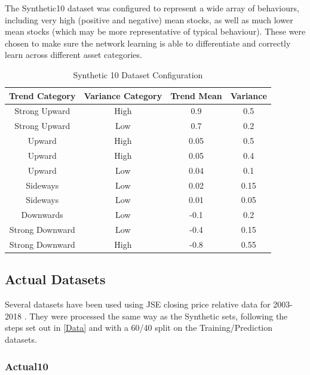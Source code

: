 \documentclass[a4paper,11pt,oneside]{article}
\theoremstyle{plain}
\theoremstyle{definition}
\begin{document}
The Synthetic10 dataset was configured to represent a wide array of behaviours, including very high (positive and negative) mean stocks, as well as much lower mean stocks (which may be more representative of typical behaviour). These were chosen to make sure the network learning is able to differentiate and correctly learn across different asset categories.

\begin{table}[H]
	\centering
	\begin{tabular}{|c|c|c|c|}
		\hline
		\textbf{Trend Category} &\textbf{Variance Category} & \textbf{Trend Mean} & \textbf{Variance}\\\hline	
		{Strong Upward} 		& {High} & {0.9} & {0.5} \\\hline
		{Strong Upward} 		& {Low} & {0.7} & {0.2} \\\hline
		{Upward} 					& {High} & {0.05} & {0.5} \\\hline
		{Upward} 					& {High} & {0.05} & {0.4} \\\hline
		{Upward} 					& {Low} & {0.04} & {0.1} \\\hline
		{Sideways} 					& {Low} & {0.02} & {0.15} \\\hline
		{Sideways}					& {Low} & {0.01} & {0.05} \\\hline
		{Downwards}				& {Low} & {-0.1} & {0.2} \\\hline
		{Strong Downward} 	& {Low} & {-0.4} & {0.15} \\\hline
		{Strong Downward}	& {High} & {-0.8} & {0.55} \\\hline
	\end{tabular}
	\newline\newline
	\caption{Synthetic 10 Dataset Configuration}\label{tab_synth10}
\end{table}


\subsection{Actual Datasets}

Several datasets have been used using JSE closing price relative data for 2003-2018 . They were processed the same way as the Synthetic sets, following the steps set out in \ref{Data} and with a 60/40 split on the Training/Prediction datasets.

\subsubsection{Actual10}\label{dataset_actual10}
\end{document}
